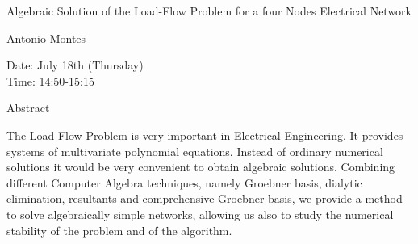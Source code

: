 \begin{center}
\LARGE
Algebraic Solution of the Load-Flow Problem for a four
                   Nodes Electrical Network
\end{center}

\begin{center}
\Large
Antonio Montes
\end{center}

\noindent
Date:  July 18th (Thursday)\\
Time:  14:50-15:15\\

\begin{center}
\large
Abstract
\end{center}

The Load Flow Problem is very important in Electrical Engineering. It provides systems of
multivariate polynomial equations. Instead of ordinary numerical solutions it would be very
convenient to obtain algebraic solutions. Combining different Computer Algebra techniques,
namely Groebner basis, dialytic elimination, resultants and comprehensive Groebner basis, we
provide a method to solve algebraically simple networks, allowing us also to study the numerical
stability of the problem and of the algorithm. 

